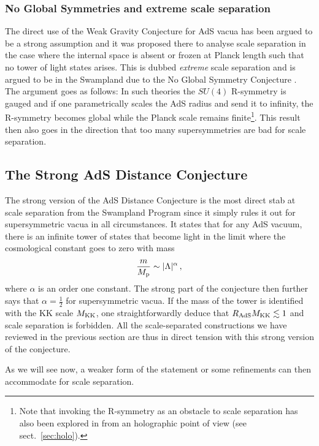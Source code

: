 \documentclass[11pt, a4paper]{article}
\newcommand{\MK}{M_{\rm KK}}
\newcommand{\Mp}{M_{\rm p}}
\newcommand{\Rads}{R_{\rm AdS}}
\newcommand{\half}{\frac{1}{2}}
\begin{document}
\subsubsection{No Global Symmetries and extreme scale separation}

The direct use of the Weak Gravity Conjecture for AdS vacua has been argued to be a strong assumption \cite{Montero:2022ghl} and it was proposed there to analyse scale separation in the case where the internal space is absent or frozen at Planck length such that no tower of light states arises. This is dubbed \emph{extreme} scale separation and is argued to be in the Swampland due to the No Global Symmetry Conjecture \cite{Banks:1988yz,Banks:2010zn}. The argument goes as follows: In such theories the $SU(4)$ R-symmetry is gauged and if one parametrically scales the AdS radius and send it to infinity, the R-symmetry becomes global while the Planck scale remains finite\footnote{Note that invoking the R-symmetry as an obstacle to scale separation has also been explored in \cite{Polchinski:2009ch} from an holographic point of view (see sect.~\ref{sec:holo}).}. This result then also goes in the direction that too many supersymmetries are bad for scale separation.

\subsection{The Strong AdS Distance Conjecture}

The strong version of the AdS Distance Conjecture \cite{Lust:2019zwm} is the most direct stab at scale separation from the Swampland Program since it simply rules it out for supersymmetric vacua in all circumstances. It states that for any AdS vacuum, there is an infinite tower of states that become light in the limit where the cosmological constant goes to zero with mass
\begin{equation}
\frac{m}{\Mp}\sim |\Lambda|^\alpha\, ,    
\end{equation}
%
where $\alpha$ is an order one constant. The strong part of the conjecture then further says that $\alpha=\half$ for supersymmetric vacua. If the mass of the tower is identified with the KK scale $\MK$, one straightforwardly deduce that $\Rads\MK\lesssim 1$ and scale separation is forbidden. All the scale-separated constructions we have reviewed in the previous section are thus in direct tension with this strong version of the conjecture.

As we will see now, a weaker form of the statement or some refinements can then accommodate for scale separation.
\end{document}
